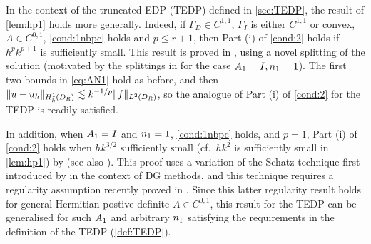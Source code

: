 In the context of the truncated EDP (TEDP) defined in \cref{sec:TEDP}, the result of \cref{lem:hp1} holds more generally. Indeed,
if $\Gamma_D\in C^{1,1}$, $\Gamma_I$ is either $C^{1,1}$ or convex, $A\in C^{0,1}$, \cref{cond:1nbpc} holds and $p\leq r+1$, then Part (i) of \cref{cond:2} holds
if $h^p k^{p+1}$ is sufficiently small. This result is proved 
in \cite{ChNi:18a}, using a novel splitting of the solution (motivated by the splittings in \cite{MeSa:10, MeSa:11} for the case $A_{1}= I, n_{1}=1$). The first two bounds in \cref{eq:AN1} hold as before, and then 
$\|u-u_h\|_{\HokDR} \lesssim  k^{-1/p}\|f\|_{\LtDR}$, so the analogue of Part (i) of \cref{cond:2} for the TEDP is readily satisfied.

In addition, when $A_{1}=I$ and $n_{1}=1$, \cref{cond:1nbpc} holds, and $p=1$,  Part (i) of \cref{cond:2} holds when $hk^{3/2}$ sufficiently small (cf.~$hk^2$ is sufficiently small in \cref{lem:hp1}) by 
\cite{ZhWu:13} (see also \cite{ChNi:18}). This proof uses 
a variation of the Schatz technique first introduced by \cite{FeWu:11} in the context of DG methods, and this technique requires a regularity assumption recently proved in \cite{ChNiTo:18}. Since this latter regularity result holds for general Hermitian-postive-definite $A\in C^{0,1}$, this result for the TEDP can be generalised for such $A_{1}$ and arbitrary $n_{1}$ satisfying the requirements in the definition of the TEDP (\cref{def:TEDP}).
\ere



